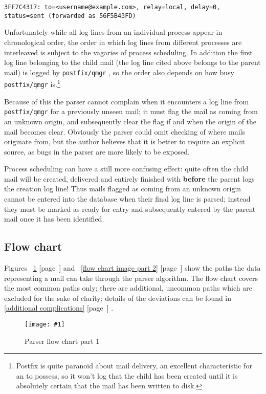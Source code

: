 \documentclass[a4paper,12pt,draft]{article}
\newcommand{\showgraph}[3]{
    \begin{figure}[hbt!]
        \caption{#2}\label{#3}
        \texttt{[image: \#1]}
    \end{figure}
}
\newcommand{\refwithpage}[1]{%
    \empty{}\ref{#1} [page~\pageref{#1}]%
}
\newcommand{\sectionref}[1]{%
    \textsection{}\refwithpage{#1}%
}
\newcommand{\daemon}[1]{%
    \texttt{postfix/#1}%
}
\begin{document}
\texttt{3FF7C4317: to=<username@example.com>, relay=local, \newline
delay=0, status=sent (forwarded as 56F5B43FD)}

Unfortunately while all log lines from an individual process appear in
chronological order, the order in which log lines from different processes
are interleaved is subject to the vagaries of process scheduling.  In
addition the first log line belonging to the child mail (the log line cited
above belongs to the parent mail) is logged by \daemon{qmgr}, so the order
also depends on how busy \daemon{qmgr} is.\footnote{Postfix is quite
paranoid about mail delivery, an excellent characteristic for an \MTA{} to
possess, so it won't log that the child has been created until it is
absolutely certain that the mail has been written to disk.}

Because of this the parser cannot complain when it encounters a log line
from \daemon{qmgr} for a previously unseen mail; it must flag the mail as
coming from an unknown origin, and subsequently clear the flag if and when
the origin of the mail becomes clear.  Obviously the parser could omit
checking of where mails originate from, but the author believes that it is
better to require an explicit source, as bugs in the parser are more likely
to be exposed.

Process scheduling can have a still more confusing effect: quite often the
child mail will be created, delivered and entirely finished with
\textbf{before} the parent logs the creation log line!  Thus mails flagged
as coming from an unknown origin cannot be entered into the database when
their final log line is parsed; instead they must be marked as ready for
entry and subsequently entered by the parent mail once it has been
identified.

\subsection{Flow chart}

\label{flow-chart}

Figures~\refwithpage{flow chart image part 1} and~\refwithpage{flow chart
image part 2} show the paths the data representing a mail can take through
the parser algorithm.  The flow chart covers the most common paths only;
there are additional, uncommon paths which are excluded for the sake of
clarity; details of the deviations can be found in \sectionref{additional
complications}.

\showgraph{build/logparser-flow-chart-part-1}{Parser flow chart part
1}{flow chart image part 1}
\end{document}
